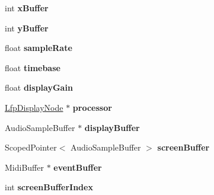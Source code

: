 \begin{DoxyCompactItemize}
\item 
\hypertarget{classLfpDisplayCanvas_a93b73f6af3deb7b991ed989fd31ecdb4}{int {\bfseries x\-Buffer}}\label{classLfpDisplayCanvas_a93b73f6af3deb7b991ed989fd31ecdb4}

\item 
\hypertarget{classLfpDisplayCanvas_a0ebed1e5d13dfbb27de142e7c52536b2}{int {\bfseries y\-Buffer}}\label{classLfpDisplayCanvas_a0ebed1e5d13dfbb27de142e7c52536b2}

\item 
\hypertarget{classLfpDisplayCanvas_a89e540f09a4f1ca02086f8a2577213e8}{float {\bfseries sample\-Rate}}\label{classLfpDisplayCanvas_a89e540f09a4f1ca02086f8a2577213e8}

\item 
\hypertarget{classLfpDisplayCanvas_a9e58888718eaf8b28afd3d09ef54d391}{float {\bfseries timebase}}\label{classLfpDisplayCanvas_a9e58888718eaf8b28afd3d09ef54d391}

\item 
\hypertarget{classLfpDisplayCanvas_a32be92992b63ec13baf20644bf049095}{float {\bfseries display\-Gain}}\label{classLfpDisplayCanvas_a32be92992b63ec13baf20644bf049095}

\item 
\hypertarget{classLfpDisplayCanvas_a15720a3c55775cdb623562a52db75ead}{\hyperlink{classLfpDisplayNode}{Lfp\-Display\-Node} $\ast$ {\bfseries processor}}\label{classLfpDisplayCanvas_a15720a3c55775cdb623562a52db75ead}

\item 
\hypertarget{classLfpDisplayCanvas_a8af8384c17db3f3f45ff5ae71ea03dec}{Audio\-Sample\-Buffer $\ast$ {\bfseries display\-Buffer}}\label{classLfpDisplayCanvas_a8af8384c17db3f3f45ff5ae71ea03dec}

\item 
\hypertarget{classLfpDisplayCanvas_a9f2c0112f64956caa7902d8522283a08}{Scoped\-Pointer$<$ Audio\-Sample\-Buffer $>$ {\bfseries screen\-Buffer}}\label{classLfpDisplayCanvas_a9f2c0112f64956caa7902d8522283a08}

\item 
\hypertarget{classLfpDisplayCanvas_ae933315568b66f703fcd736ba97d649a}{Midi\-Buffer $\ast$ {\bfseries event\-Buffer}}\label{classLfpDisplayCanvas_ae933315568b66f703fcd736ba97d649a}

\item 
\hypertarget{classLfpDisplayCanvas_ac97051e1ac0f4069e129044b58ce884c}{int {\bfseries screen\-Buffer\-Index}}\label{classLfpDisplayCanvas_ac97051e1ac0f4069e129044b58ce884c}


\end{DoxyCompactItemize}
